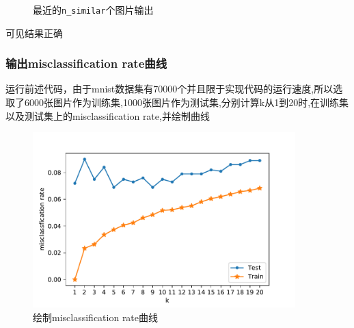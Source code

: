 \documentclass[UTF8]{ctexart}
\begin{document}
\begin{figure}[h]
    
    \caption{最近的\lstinline{n_similar}个图片输出}
\end{figure}
可见结果正确

\newpage
\subsubsection{输出misclassification rate曲线}
运行前述代码，由于mnist数据集有70000个并且限于实现代码的运行速度,所以选取了6000张图片作为训练集,1000张图片作为测试集,分别计算k从1到20时,在训练集
以及测试集上的misclassification rate,并绘制曲线
\begin{figure}[h]
    \centering
    \includegraphics[width=4in]{asset/misclassification.pdf}
    \caption{绘制misclassification rate曲线} %
\end{figure}
\end{document}
